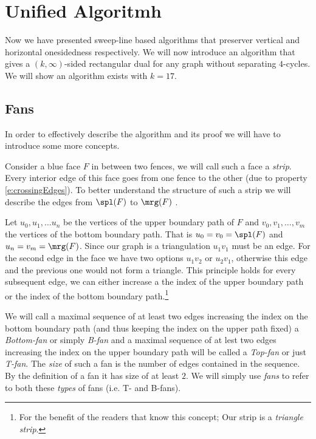 
\newenvironment{invariants}{%
  \refstepcounter{thrm}%
  \paragraph{Invariants~\theprop}%
  \renewcommand*{\theenumi}{\theprop\,(I\arabic{enumi})}%
  \renewcommand*{\labelenumi}{(I\arabic{enumi})}%
  \enumerate
}{%
  \endenumerate
}

\section{Unified Algoritmh}

Now we have presented sweep-line based algorithms that preserver vertical and horizontal onesidedness respectively. We will now introduce an algorithm that gives a $(k,\infty)$-sided rectangular dual for any graph without separating $4$-cycles. We will show an algorithm exists with $k=17$.


 \subsection{Fans}
 In order to effectively describe the algorithm and its proof we will have to introduce some more concepts.

 Consider a blue face $F$ in between two fences, we will call such a face a \emph{strip}. Every interior edge of this face goes from one fence to the other (due to property \ref{e:crossingEdges}). To better understand the structure of such a strip we will describe the edges from $\spl(F)$ to $\mrg(F)$ .

 Let $u_0 , u_1, \ldots u_n$ be the vertices of the upper boundary path of $F$ and $v_0, v_1, \ldots, v_m$ the vertices of the bottom boundary path. That is $u_0=v_0 = \spl(F)$ and $u_n = v_m = \mrg(F)$. Since our graph is a triangulation $u_1v_1$ must be an edge. For the second edge in the face we have two options $u_1v_2$ or $u_2v_1$, otherwise this edge and the previous one would not form a triangle. This principle holds for every subsequent edge, we can either increase a the index of the upper boundary path or the index of the bottom boundary path.\footnote{For the benefit of the readers that know this concept; Our strip is a \emph{triangle strip}.}

 We will call a maximal sequence of at least two edges increasing the index on the bottom boundary path (and thus keeping the index on the upper path fixed) a \emph{Bottom-fan} or simply \emph{B-fan} and a maximal sequence of at lest two edges increasing the index on the upper boundary path will be called a \emph{Top-fan} or just \emph{T-fan}. The \emph{size} of such a fan is the number of edges contained in the sequence. By the definition of a fan it has size of at least $2$.
  We will simply use \emph{fans} to refer to both these \emph{types} of fans (i.e. T- and B-fans).

